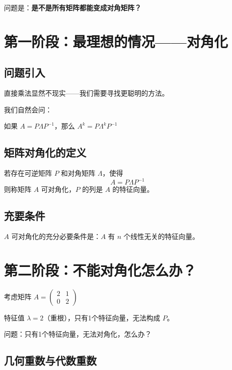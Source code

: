\documentclass[12pt,a4paper]{article}
\begin{document}
问题是：\textbf{是不是所有矩阵都能变成对角矩阵？}

\section{第一阶段：最理想的情况——对角化}

\subsection{问题引入}

\begin{center}
\end{center}

直接乘法显然不现实——我们需要寻找更聪明的方法。

我们自然会问：

\begin{center}
\end{center}

如果 $A = P\Lambda P^{-1}$，那么 $A^k = P\Lambda^k P^{-1}$

\subsection{矩阵对角化的定义}

若存在可逆矩阵 $P$ 和对角矩阵 $\Lambda$，使得
\[
A = P\Lambda P^{-1}
\]
则称矩阵 $A$ 可对角化，$P$ 的列是 $A$ 的特征向量。

\subsection{充要条件}

$A$ 可对角化的充分必要条件是：$A$ 有 $n$ 个线性无关的特征向量。

\section{第二阶段：不能对角化怎么办？}

考虑矩阵 $A = \begin{pmatrix} 2 & 1 \\ 0 & 2 \end{pmatrix}$

特征值 $\lambda = 2$（重根），只有1个特征向量，无法构成 $P$。

问题：只有1个特征向量，无法对角化，怎么办？

\subsection{几何重数与代数重数}
\end{document}
